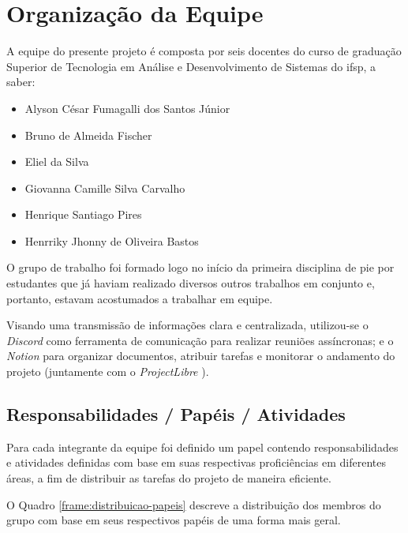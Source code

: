\section{Organização da Equipe}

A equipe do presente projeto é composta por seis docentes do curso de graduação Superior de Tecnologia em Análise e Desenvolvimento de Sistemas do \gls{ifsp}, a saber:

\begin{itemize}
	\item Alyson César Fumagalli dos Santos Júnior
	\item Bruno de Almeida Fischer
	\item Eliel da Silva
	\item Giovanna Camille Silva Carvalho
	\item Henrique Santiago Pires
	\item Henrriky Jhonny de Oliveira Bastos
\end{itemize}

O grupo de trabalho foi formado logo no início da primeira disciplina de \gls{pie} por estudantes que já haviam realizado diversos outros trabalhos em conjunto e, portanto, estavam acostumados a trabalhar em equipe.

Visando uma transmissão de informações clara e centralizada, utilizou-se o \emph{Discord} \cite{discord-2025} como ferramenta de comunicação para realizar reuniões assíncronas; e o \emph{Notion} \cite{notion-2025} para organizar documentos, atribuir tarefas e monitorar o andamento do projeto (juntamente com o \emph{ProjectLibre} \cite{projectlibre-2025}).

\subsection{Responsabilidades / Papéis / Atividades}

Para cada integrante da equipe foi definido um papel contendo responsabilidades e atividades definidas com base em suas respectivas proficiências em diferentes áreas, a fim de distribuir as tarefas do projeto de maneira eficiente.

O Quadro \ref{frame:distribuicao-papeis} descreve a distribuição dos membros do grupo com base em seus respectivos papéis de uma forma mais geral.

